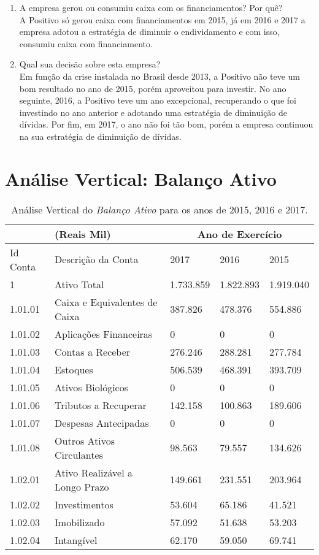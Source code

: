 \begin{enumerate}
\item A empresa gerou ou consumiu caixa com os financiamentos? Por quê? \\ A Positivo só gerou caixa com financiamentos em 2015, já em 2016 e 2017 a empresa adotou a estratégia de diminuir o endividamento e com isso, consumiu caixa com financiamento.

\item Qual sua decisão sobre esta empresa? \\ Em função da crise instalada no Brasil desde 2013, a Positivo não teve um bom resultado no ano de 2015, porém aproveitou para investir. No ano seguinte, 2016, a Positivo teve um ano excepcional, recuperando o que foi investindo no ano anterior e adotando uma estratégia de diminuição de dívidas. Por fim, em 2017, o ano não foi tão bom, porém a empresa continuou na sua estratégia de diminuição de dívidas.
\end{enumerate}

\section{Análise Vertical: Balanço Ativo}

\begin{center}
\begin{table}[H]
\begin{tabular}{p{}|p{}|p{}|p{}|p{}}
\hline 
 & (Reais Mil) & \multicolumn{3}{c}{Ano de Exercício}\tabularnewline
\hline 
Id Conta & Descrição da Conta & 2017 & 2016 & 2015\tabularnewline
\hline 
1 & Ativo Total & 1.733.859 & 1.822.893 & 1.919.040\tabularnewline
1.01.01 & Caixa e Equivalentes de Caixa & 387.826 & 478.376 & 554.886\tabularnewline
1.01.02 & Aplicações Financeiras & 0 & 0 & 0\tabularnewline
1.01.03 & Contas a Receber & 276.246 & 288.281 & 277.784\tabularnewline
1.01.04 & Estoques & 506.539 & 468.391 & 393.709\tabularnewline
1.01.05 & Ativos Biológicos & 0 & 0 & 0\tabularnewline
1.01.06 & Tributos a Recuperar & 142.158 & 100.863 & 189.606\tabularnewline
1.01.07 & Despesas Antecipadas & 0 & 0 & 0\tabularnewline
1.01.08 & Outros Ativos Circulantes & 98.563 & 79.557 & 134.626\tabularnewline
1.02.01 & Ativo Realizável a Longo Prazo & 149.661 & 231.551 & 203.964\tabularnewline
1.02.02 & Investimentos & 53.604 & 65.186 & 41.521\tabularnewline
1.02.03 & Imobilizado & 57.092 & 51.638 & 53.203\tabularnewline
1.02.04 & Intangível & 62.170 & 59.050 & 69.741\tabularnewline
\hline 
\end{tabular}
\caption{\label{tab:balancoAtivo} Análise Vertical do \emph{Balanço Ativo} para  os anos de 2015, 2016 e 2017.}
\end{table}
\vspace*{-40pt}
\par\end{center}

